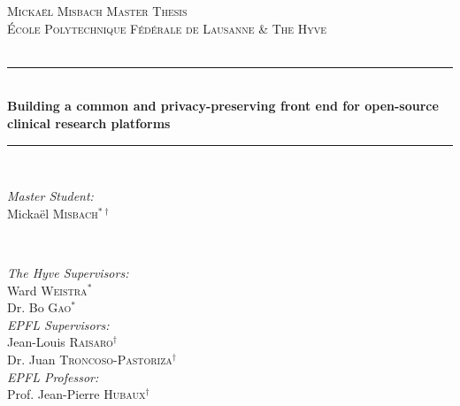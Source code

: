 \begin{titlepage}

\newcommand{\HRule}{\rule{\linewidth}{0.5mm}}
\center
 
\textsc{\LARGE Mickaël Misbach Master Thesis}\\[0.5cm]

\textsc{\Large École Polytechnique Fédérale de Lausanne \& The Hyve}\\[0.5cm] 
\textsc{\large \reportTitle}\\[0.5cm]

\HRule \\[0.4cm]
{ \huge \bfseries Building a common and privacy-preserving front end for open-source clinical research platforms}\\[0.4cm]
\HRule \\[1cm]
 
\begin{minipage}{0.4\textwidth}
\begin{flushleft} \large
\emph{Master Student:}\\
Mickaël \textsc{Misbach}$^{*\dagger}$\\
\end{flushleft}
\end{minipage}
~
\begin{minipage}{0.4\textwidth}
\begin{flushright} \large
\emph{The Hyve Supervisors:} \\
Ward \textsc{Weistra}$^*$\\
Dr. Bo \textsc{Gao}$^*$\\[\baselineskip]
\emph{EPFL Supervisors:} \\
Jean-Louis \textsc{Raisaro}$^\dagger$\\
Dr. Juan \textsc{Troncoso-Pastoriza}$^\dagger$\\[\baselineskip]
\emph{EPFL Professor:} \\
Prof. Jean-Pierre \textsc{Hubaux}$^\dagger$\\
\end{flushright}
\end{minipage}\\[1.5cm]



\end{titlepage}
